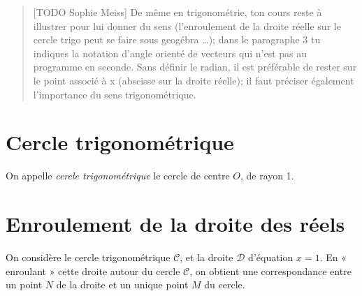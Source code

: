 \begin{quotation}[TODO Sophie Meiss]
De même en trigonométrie, ton cours reste à illustrer pour lui donner du 
sens (l'enroulement de la droite réelle sur le cercle trigo peut se 
faire sous geogébra \ldots); dans le paragraphe 3 tu indiques la notation 
d'angle orienté de vecteurs qui n'est pas au programme en seconde. Sans 
définir le radian, il est préférable de rester sur le point associé à x 
(abscisse sur la droite réelle); il faut préciser également l'importance 
du sens trigonométrique.
\end{quotation}

\section{Cercle trigonométrique}

\begin{multicols}{2}
\begin{definition}
  On appelle \emph{cercle trigonométrique} le cercle de centre $O$, de rayon 1.
\end{definition}

\begin{center}
\end{center}
\end{multicols}

\section{Enroulement de la droite des réels}

\begin{multicols}{2}
On considère le cercle trigonométrique $\mathcal C$, et la droite $\mathcal D$ d'équation $x=1$. En « enroulant » cette droite autour du cercle $\mathcal C$, on obtient une correspondance entre un point $N$ de la droite et un unique point $M$ du cercle.

\end{multicols}


